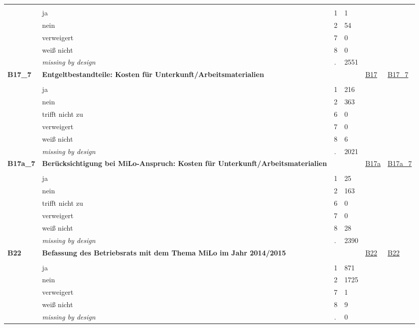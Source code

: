 \begin{longtable}{| L{2.45cm} | L{6cm} | C{1.5cm} | R{1cm} | C{2.25cm} | C{2.25cm} |}
   &  &  &  &  &  \\ 
   & ja & 1 & 1 &  &  \\ 
   & nein & 2 & 54 &  &  \\ 
   & verweigert & 7 & 0 &  &  \\ 
   & weiß nicht & 8 & 0 &  &  \\ 
   & \textit{missing by design} & \textit{.} & 2551 &  &  \\ 
   \midrule
\textbf{B17\_7}\label{var:B17:7} & \textbf{Entgeltbestandteile: Kosten für Unterkunft/Arbeitsmaterialien} &  &  & \hyperref[B17]{B17} & \hyperref[var:suf:B17:7]{B17\_7} \\ 
   &  &  &  &  &  \\ 
   & ja & 1 & 216 &  &  \\ 
   & nein & 2 & 363 &  &  \\ 
   & trifft nicht zu & 6 & 0 &  &  \\ 
   & verweigert & 7 & 0 &  &  \\ 
   & weiß nicht & 8 & 6 &  &  \\ 
   & \textit{missing by design} & \textit{.} & 2021 &  &  \\ 
   \midrule
\textbf{B17a\_7}\label{var:B17a:7} & \textbf{Berücksichtigung bei MiLo-Anspruch: Kosten für Unterkunft/Arbeitsmaterialien} &  &  & \hyperref[B17a]{B17a} & \hyperref[var:suf:B17a:7]{B17a\_7} \\ 
   &  &  &  &  &  \\ 
   & ja & 1 & 25 &  &  \\ 
   & nein & 2 & 163 &  &  \\ 
   & trifft nicht zu & 6 & 0 &  &  \\ 
   & verweigert & 7 & 0 &  &  \\ 
   & weiß nicht & 8 & 28 &  &  \\ 
   & \textit{missing by design} & \textit{.} & 2390 &  &  \\ 
   \midrule
\textbf{B22}\label{var:B22} & \textbf{Befassung des Betriebsrats mit dem Thema MiLo im Jahr 2014/2015} &  &  & \hyperref[B22]{B22} & \hyperref[var:suf:B22]{B22} \\ 
   &  &  &  &  &  \\ 
   & ja & 1 & 871 &  &  \\ 
   & nein & 2 & 1725 &  &  \\ 
   & verweigert & 7 & 1 &  &  \\ 
   & weiß nicht & 8 & 9 &  &  \\ 
   & \textit{missing by design} & \textit{.} & 0 &  &  \\ 

\end{longtable}
